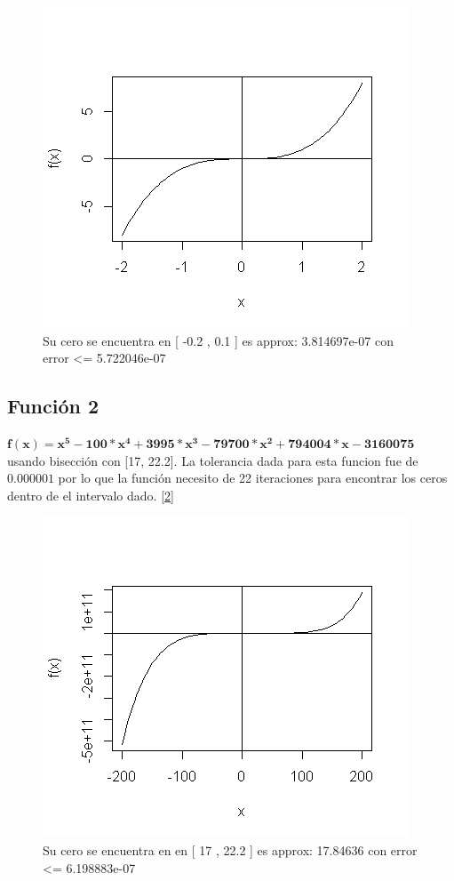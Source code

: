\documentclass[12pt,a4paper]{article}
\begin{document}
 
\begin{figure}
\centering
\includegraphics[scale=0.9]{funcion1}
\caption{Su cero se encuentra en [ -0.2 , 0.1 ] es approx:  3.814697e-07 con error <= 5.722046e-07}
\label{funcion1}
\end{figure} 
 
\subsection{Función 2}
$\mathbf{f(x)= x^5 - 100*x^4 + 3995*x^3 - 79700*x^2 + 794004*x - 3160075 }$ usando bisección con [17, 22.2]. La tolerancia dada para esta funcion fue de $0.000001$ por lo que la función necesito de 22 iteraciones para encontrar los ceros dentro de el intervalo dado. [\ref{funcion2}] \\


\begin{figure}
\centering
\includegraphics[scale=0.9]{funcion2}
\caption{Su cero se encuentra en en [ 17 , 22.2 ] es approx:  17.84636 con error <= 6.198883e-07}
\label{funcion2}
\end{figure}
 
\end{document}
